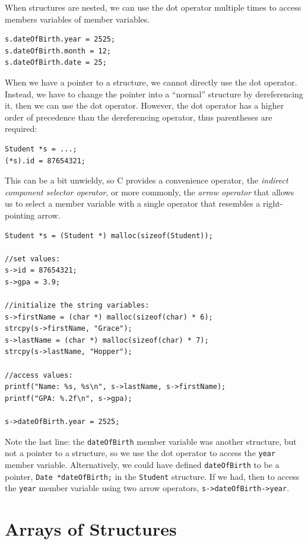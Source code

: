 When structures are nested, we can use the dot operator multiple
times to access members variables of member variables.

\begin{verbatim}
s.dateOfBirth.year = 2525;
s.dateOfBirth.month = 12;
s.dateOfBirth.date = 25;
\end{verbatim}

When we have a pointer to a structure, we cannot directly use
the dot operator.  Instead, we have to change the pointer into
a ``normal'' structure by dereferencing it, then we can use the
dot operator.  However, the dot operator has a higher order of
precedence than the dereferencing operator, thus parentheses are 
required:

\begin{verbatim}
Student *s = ...;
(*s).id = 87654321;
\end{verbatim}

This can be a bit unwieldy, so C provides a convenience operator, 
the \emph{indirect component selector operator}, or more commonly,
the  \emph{arrow operator} that allows us 
to select a member variable
with a single operator that resembles a right-pointing arrow.

\begin{verbatim}
Student *s = (Student *) malloc(sizeof(Student));

//set values:
s->id = 87654321;
s->gpa = 3.9;

//initialize the string variables:
s->firstName = (char *) malloc(sizeof(char) * 6);
strcpy(s->firstName, "Grace");
s->lastName = (char *) malloc(sizeof(char) * 7);
strcpy(s->lastName, "Hopper");

//access values:
printf("Name: %s, %s\n", s->lastName, s->firstName);
printf("GPA: %.2f\n", s->gpa);

s->dateOfBirth.year = 2525;
\end{verbatim}

Note the last line: the \texttt{dateOfBirth} member variable
was another structure, but not a pointer to a structure, so we
use the dot operator to access the \texttt{year} member
variable.  Alternatively, we could have defined \texttt{dateOfBirth}
to be a pointer, \texttt{Date *dateOfBirth;} in the 
\texttt{Student} structure.  If we had, then to access the 
\texttt{year} member variable using two arrow operators, 
\texttt{s->dateOfBirth->year}.

\section{Arrays of Structures}

